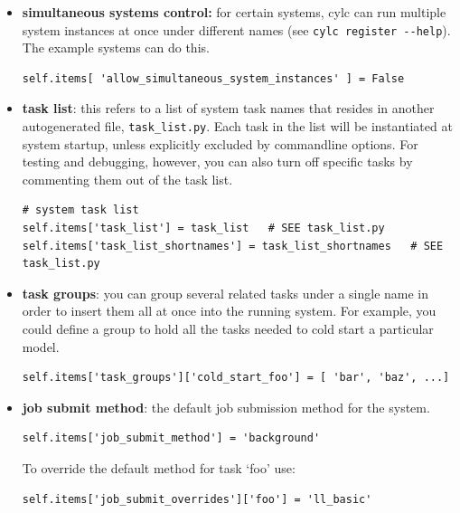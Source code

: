 \documentclass[11pt,a4paper]{article}
\begin{document}
\begin{itemize} 
    \item {\bf simultaneous systems control:} for certain systems, cylc
        can run multiple system instances at once under different names
        (see \lstinline=cylc register --help=). The example systems
        can do this. 
         \begin{lstlisting}
self.items[ 'allow_simultaneous_system_instances' ] = False
         \end{lstlisting}
  
    \item {\bf task list}: this refers to a list of system task names
        that resides in another autogenerated file,
        \lstinline=task_list.py=. Each task in the list will be
        instantiated at system startup, unless explicitly excluded by
        commandline options. For testing and debugging, however, you
        can also turn off specific tasks by commenting them out
        of the task list.
        
        \begin{lstlisting}
# system task list
self.items['task_list'] = task_list   # SEE task_list.py
self.items['task_list_shortnames'] = task_list_shortnames   # SEE task_list.py
        \end{lstlisting}

    \item {\bf task groups}: you can group several related tasks under a
        single name in order to insert them all at once into the running
        system. For example, you could define a group to hold all the
        tasks needed to cold start a particular model.

        \begin{lstlisting}
self.items['task_groups']['cold_start_foo'] = [ 'bar', 'baz', ...]
        \end{lstlisting}

    \item {\bf job submit method}: the default job submission method 
        for the system.

        \begin{lstlisting}
self.items['job_submit_method'] = 'background'
        \end{lstlisting}

        To override the default method for task `foo' use:

        \begin{lstlisting}
self.items['job_submit_overrides']['foo'] = 'll_basic'
        \end{lstlisting}


\end{itemize}
\end{document}

